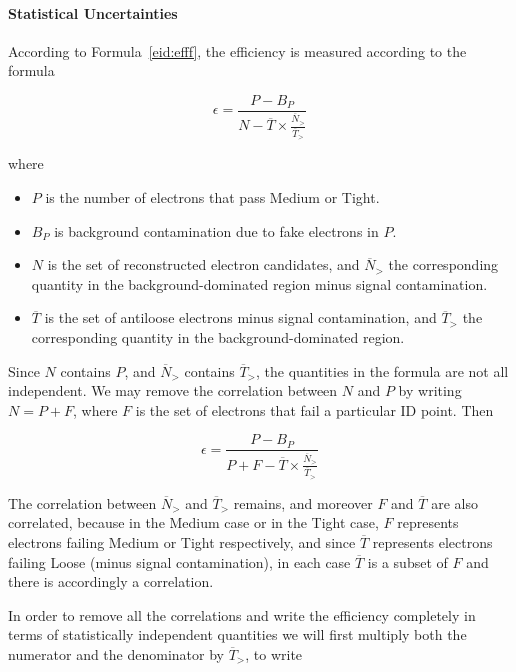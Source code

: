 \paragraph{Statistical Uncertainties} According to Formula~\ref{eid:efff}, the
efficiency is measured according to the formula


$$
	\epsilon = \frac{P-B_P}{N - \overline{T} \times \frac{\overline{N}_>}{\overline{T}_>}}
$$

where

\begin{itemize}
	\item $P$ is the number of electrons that pass Medium or Tight.

	\item $B_P$ is background contamination due to fake electrons in $P$.

	\item $N$ is the set of reconstructed electron candidates, and $\overline{N}_>$
	      the corresponding quantity in the background-dominated region minus signal
	      contamination.

	\item $\overline{T}$ is the set of antiloose electrons minus signal
	      contamination, and $\overline{T}_>$ the corresponding quantity in the
	      background-dominated region.

\end{itemize}

Since $N$ contains $P$, and $\overline{N}_>$ contains $\overline{T}_>$, the
quantities in the formula are not all independent. We may remove the
correlation between $N$ and $P$ by writing $N = P + F$, where $F$ is the set of
electrons that fail a particular ID point. Then

$$
	\epsilon = \frac{P-B_P}{P + F - \overline{T} \times \frac{\overline{N}_>}{\overline{T}_>}}
$$


The correlation between $\overline{N}_>$ and $\overline{T}_>$ remains, and
moreover $F$ and $\overline{T}$ are also correlated, because in the Medium case
or in the Tight case, $F$ represents electrons failing Medium or Tight
respectively, and since $\overline{T}$ represents electrons failing Loose
(minus signal contamination), in each case $\overline{T}$ is a subset of $F$
and there is accordingly a correlation.

In order to remove all the correlations and write the efficiency completely in
terms of statistically independent quantities we will first multiply both the
numerator and the denominator by $\overline{T}_>$, to write

